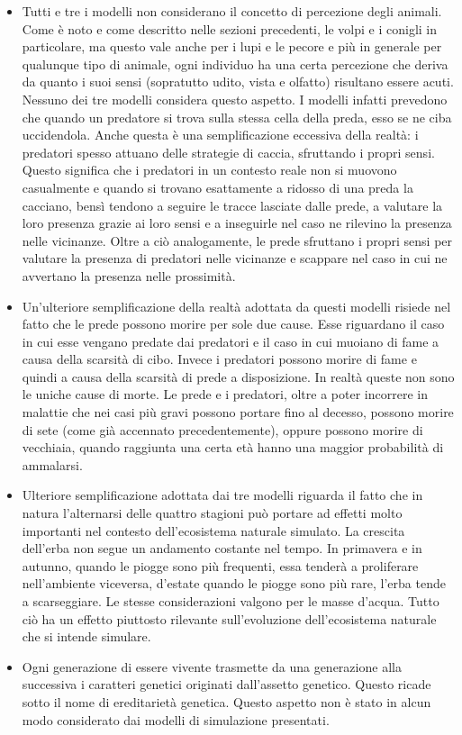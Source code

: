 \documentclass[11pt]{article}
\begin{document}
\begin{itemize}
    \item Tutti e tre i modelli non considerano il concetto di percezione degli animali. Come è noto e come descritto nelle sezioni precedenti, le volpi e i conigli in particolare, ma questo vale anche per i lupi e le pecore e più in generale per qualunque tipo di animale, ogni individuo ha una certa percezione che deriva da quanto i suoi sensi (sopratutto udito, vista e olfatto) risultano essere acuti. Nessuno dei tre modelli considera questo aspetto. I modelli infatti prevedono che quando un predatore si trova sulla stessa cella della preda, esso se ne ciba uccidendola. Anche questa è una semplificazione eccessiva della realtà: i predatori spesso attuano delle strategie di caccia, sfruttando i propri sensi. Questo significa che i predatori in un contesto reale non si muovono casualmente e quando si trovano esattamente a ridosso di una preda la cacciano, bensì tendono a seguire le tracce lasciate dalle prede, a valutare la loro presenza grazie ai loro sensi e a inseguirle nel caso ne rilevino la presenza nelle vicinanze. Oltre a ciò analogamente, le prede sfruttano i propri sensi per valutare la presenza di predatori nelle vicinanze e scappare nel caso in cui ne avvertano la presenza nelle prossimità.
    \item Un'ulteriore semplificazione della realtà adottata da questi modelli risiede nel fatto che le prede possono morire per sole due cause. Esse riguardano il caso in cui esse vengano predate dai predatori e il caso in cui muoiano di fame a causa della scarsità di cibo. Invece i predatori possono morire di fame e quindi a causa della scarsità di prede a disposizione. In realtà queste non sono le uniche cause di morte. Le prede e i predatori, oltre a poter incorrere in malattie che nei casi più gravi possono portare fino al decesso, possono morire di sete (come già accennato precedentemente), oppure possono morire di vecchiaia, quando raggiunta una certa età hanno una maggior probabilità di ammalarsi. 
    \item Ulteriore semplificazione adottata dai tre modelli riguarda il fatto che in natura l'alternarsi delle quattro stagioni può portare ad effetti molto importanti nel contesto dell'ecosistema naturale simulato. La crescita dell'erba non segue un andamento costante nel tempo. In primavera e in autunno, quando le piogge sono più frequenti, essa tenderà a proliferare nell'ambiente viceversa, d'estate quando le piogge sono più rare, l'erba tende a scarseggiare. Le stesse considerazioni valgono per le masse d'acqua. Tutto ciò ha un effetto piuttosto rilevante sull'evoluzione dell'ecosistema naturale che si intende simulare. 
    \item Ogni generazione di essere vivente trasmette da una generazione alla successiva i caratteri genetici originati dall'assetto genetico.  Questo ricade sotto il nome di ereditarietà genetica. Questo aspetto non è stato in alcun modo considerato dai modelli di simulazione presentati. 
\end{itemize}
\end{document}
